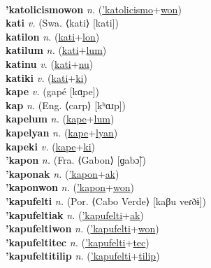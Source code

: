  \label{'katolicismoak} \\
\textbf{'katolicismowon} \textit{n.} (\hyperref['katolicismo]{'katolicismo}+\hyperref[won]{won})
 \label{'katolicismowon} \\
\textbf{kati} \textit{v.} (Swa. ⟨kati⟩ [kati])
 \label{kati} \\
\textbf{katilon} \textit{n.} (\hyperref[kati]{kati}+\hyperref[lon]{lon})
 \label{katilon} \\
\textbf{katilum} \textit{n.} (\hyperref[kati]{kati}+\hyperref[lum]{lum})
 \label{katilum} \\
\textbf{katinu} \textit{v.} (\hyperref[kati]{kati}+\hyperref[nu]{nu})
 \label{katinu} \\
\textbf{katiki} \textit{v.} (\hyperref[kati]{kati}+\hyperref[ki]{ki})
 \label{katiki} \\
\textbf{kape} \textit{v.} ({\javanese{}gapé} [kɑ̤pe])
 \label{kape} \\
\textbf{kap} \textit{n.} (Eng. ⟨carp⟩ [kʰɑɹp])
 \label{kap} \\
\textbf{kapelum} \textit{n.} (\hyperref[kape]{kape}+\hyperref[lum]{lum})
 \label{kapelum} \\
\textbf{kapelyan} \textit{n.} (\hyperref[kape]{kape}+\hyperref[lyan]{lyan})
 \label{kapelyan} \\
\textbf{kapeki} \textit{v.} (\hyperref[kape]{kape}+\hyperref[ki]{ki})
 \label{kapeki} \\
\textbf{'kapon} \textit{n.} (Fra. ⟨Gabon⟩ [ɡabɔ̃])
 \label{'kapon} \\
\textbf{'kaponak} \textit{n.} (\hyperref['kapon]{'kapon}+\hyperref[ak]{ak})
 \label{'kaponak} \\
\textbf{'kaponwon} \textit{n.} (\hyperref['kapon]{'kapon}+\hyperref[won]{won})
 \label{'kaponwon} \\
\textbf{'kapufelti} \textit{n.} (Por. ⟨Cabo Verde⟩ [kaβu veɾðɨ])
 \label{'kapufelti} \\
\textbf{'kapufeltiak} \textit{n.} (\hyperref['kapufelti]{'kapufelti}+\hyperref[ak]{ak})
 \label{'kapufeltiak} \\
\textbf{'kapufeltiwon} \textit{n.} (\hyperref['kapufelti]{'kapufelti}+\hyperref[won]{won})
 \label{'kapufeltiwon} \\
\textbf{'kapufeltitec} \textit{n.} (\hyperref['kapufelti]{'kapufelti}+\hyperref[tec]{tec})
 \label{'kapufeltitec} \\
\textbf{'kapufeltitilip} \textit{n.} (\hyperref['kapufelti]{'kapufelti}+\hyperref[tilip]{tilip})
 \label{'kapufeltitilip} \\
